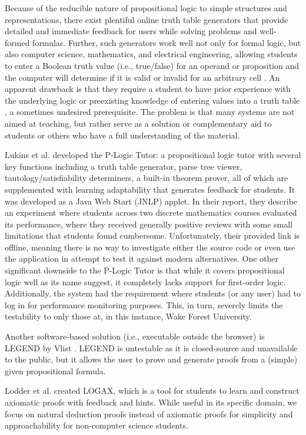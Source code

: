 \documentclass[ms]{uncgdissertationexp2}
\theoremstyle{plain}
\theoremstyle{definition}
\theoremstyle{remark}
\begin{document}
Because of the reducible nature of propositional logic to simple structures and representations, there exist plentiful online truth table generators that provide detailed and immediate feedback for users while solving problems and well-formed formulas. Further, such generators work well not only for formal logic, but also computer science, mathematics, and electrical engineering, allowing students to enter a Boolean truth value (i.e., true/false) for an operand or proposition and the computer will determine if it is valid or invalid for an arbitrary cell \cite{truthtablefennell}. An apparent drawback is that they require a student to have prior experience with the underlying logic or preexisting knowledge of entering values into a truth table \cite{koedinger}, a sometimes undesired prerequisite. The problem is that many systems are not aimed at teaching, but rather serve as a solution or complementary aid to students or others who have a full understanding of the material.

Lukins et al. \cite{lukins} developed the P-Logic Tutor: a propositional logic tutor with several key functions including a truth table generator, parse tree viewer, tautology/satisfiability determiners, a built-in theorem prover, all of which are supplemented with learning adaptability that generates feedback for students. It was developed as a Java Web Start (JNLP) applet. In their report, they describe an experiment where students across two discrete mathematics courses evaluated its performance, where they received generally positive reviews with some small limitations that students found cumbersome. Unfortunately, their provided link is offline, meaning there is no way to investigate either the source code or even use the application in attempt to test it against modern alternatives. One other significant downside to the P-Logic Tutor is that while it covers propositional logic well as its name suggest, it completely lacks support for first-order logic. Additionally, the system had the requirement where students (or any user) had to log in for performance monitoring purposes. This, in turn, severely limits the testability to only those at, in this instance, Wake Forest University. 

Another software-based solution (i.e., executable outside the browser) is LEGEND by Vlist \cite{vlist}. LEGEND is untestable as it is closed-source and unavailable to the public, but it allows the user to prove and generate proofs from a (simple) given propositional formula.

Lodder et al. \cite{lodder} created LOGAX, which is a tool for students to learn and construct axiomatic proofs with feedback and hints. While useful in its specific domain, we focus on natural deduction proofs instead of axiomatic proofs for simplicity and approachability for non-computer science students.
\end{document}
